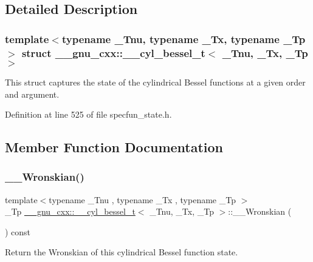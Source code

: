 \subsection{Detailed Description}
\subsubsection*{template$<$typename \+\_\+\+Tnu, typename \+\_\+\+Tx, typename \+\_\+\+Tp$>$\newline
struct \+\_\+\+\_\+gnu\+\_\+cxx\+::\+\_\+\+\_\+cyl\+\_\+bessel\+\_\+t$<$ \+\_\+\+Tnu, \+\_\+\+Tx, \+\_\+\+Tp $>$}

This struct captures the state of the cylindrical Bessel functions at a given order and argument. 

Definition at line 525 of file specfun\+\_\+state.\+h.



\subsection{Member Function Documentation}
\mbox{\label{struct____gnu__cxx_1_1____cyl__bessel__t_aa311a0f4636243a07d0c1d0660e5c213}} 
\subsubsection{\texorpdfstring{\+\_\+\+\_\+\+Wronskian()}{\_\_Wronskian()}}
{\footnotesize\ttfamily template$<$typename \+\_\+\+Tnu , typename \+\_\+\+Tx , typename \+\_\+\+Tp $>$ \\
\+\_\+\+Tp \hyperlink{struct____gnu__cxx_1_1____cyl__bessel__t}{\+\_\+\+\_\+gnu\+\_\+cxx\+::\+\_\+\+\_\+cyl\+\_\+bessel\+\_\+t}$<$ \+\_\+\+Tnu, \+\_\+\+Tx, \+\_\+\+Tp $>$\+::\+\_\+\+\_\+\+Wronskian (\begin{DoxyParamCaption}{ }\end{DoxyParamCaption}) const\hspace{0.3cm}{\ttfamily [inline]}}



Return the Wronskian of this cylindrical Bessel function state. 



